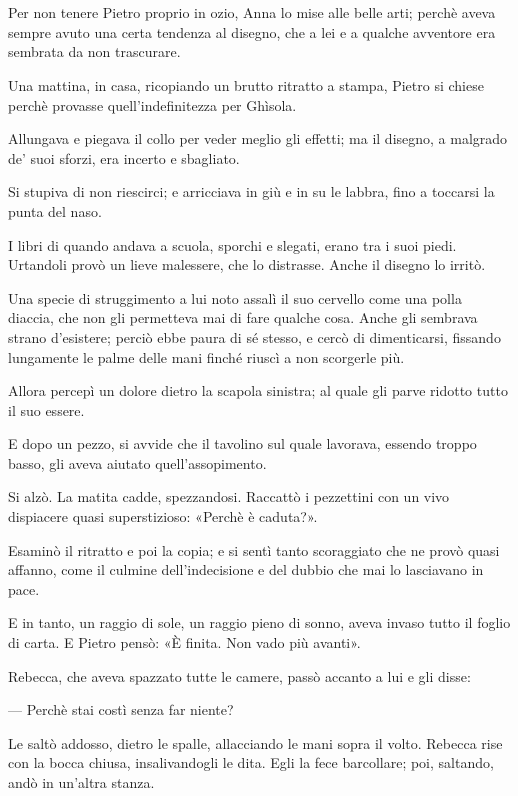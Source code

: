 \chapter{}

Per non tenere Pietro proprio in ozio, Anna lo mise alle belle arti; perchè aveva sempre avuto una certa tendenza al disegno, che a lei e a qualche avventore era sembrata da non trascurare.

Una mattina, in casa, ricopiando un brutto ritratto a stampa, Pietro si chiese perchè provasse quell'indefinitezza per Ghìsola.

Allungava e piegava il collo per veder meglio gli effetti; ma il disegno, a malgrado de' suoi sforzi, era incerto e sbagliato.

Si stupiva di non riescirci; e arricciava in giù e in su le labbra, fino a toccarsi la punta del naso.

I libri di quando andava a scuola, sporchi e slegati, erano tra i suoi piedi. Urtandoli provò un lieve malessere, che lo distrasse. Anche il disegno lo irritò.

Una specie di struggimento a lui noto assalì il suo cervello come una polla diaccia, che non gli permetteva mai di fare qualche cosa. Anche gli sembrava strano d'esistere; perciò ebbe paura di sé stesso, e cercò di dimenticarsi, fissando lungamente le palme delle mani finché riuscì a non scorgerle più.

Allora percepì un dolore dietro la scapola sinistra; al quale gli parve ridotto tutto il suo essere.

E dopo un pezzo, si avvide che il tavolino sul quale lavorava, essendo troppo basso, gli aveva aiutato quell'assopimento.

Si alzò. La matita cadde, spezzandosi. Raccattò i pezzettini con un vivo dispiacere quasi superstizioso: «Perchè è caduta?».

Esaminò il ritratto e poi la copia; e si sentì tanto scoraggiato che ne provò quasi affanno, come il culmine dell'indecisione e del dubbio che mai lo lasciavano in pace.

E in tanto, un raggio di sole, un raggio pieno di sonno, aveva invaso tutto il foglio di carta. E Pietro pensò: «È finita. Non vado più avanti».

Rebecca, che aveva spazzato tutte le camere, passò accanto a lui e gli disse:

— Perchè stai costì senza far niente?

Le saltò addosso, dietro le spalle, allacciando le mani sopra il volto. Rebecca rise con la bocca chiusa, insalivandogli le dita. Egli la fece barcollare; poi, saltando, andò in un'altra stanza.
